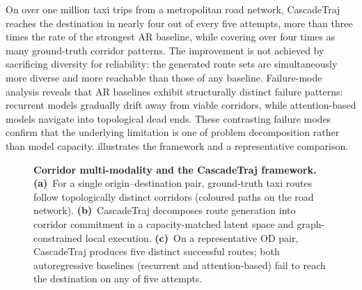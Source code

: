 On over one million taxi trips from a metropolitan road network, CascadeTraj reaches the destination in nearly four out of every five attempts, more than three times the rate of the strongest AR baseline, while covering over four times as many ground-truth corridor patterns.
The improvement is not achieved by sacrificing diversity for reliability: the generated route sets are simultaneously more diverse and more reachable than those of any baseline.
Failure-mode analysis reveals that AR baselines exhibit structurally distinct failure patterns: recurrent models gradually drift away from viable corridors, while attention-based models navigate into topological dead ends.
These contrasting failure modes confirm that the underlying limitation is one of problem decomposition rather than model capacity.
 illustrates the framework and a representative comparison.

\begin{figure}[b]
  \centering
  \caption{%
    \textbf{Corridor multi-modality and the CascadeTraj framework.}
    \textbf{(a)}~For a single origin--destination pair, ground-truth taxi routes follow topologically distinct corridors (coloured paths on the road network).
    \textbf{(b)}~CascadeTraj decomposes route generation into corridor commitment in a capacity-matched latent space and graph-constrained local execution.
    \textbf{(c)}~On a representative OD pair, CascadeTraj produces five distinct successful routes; both autoregressive baselines (recurrent and attention-based) fail to reach the destination on any of five attempts.
  }
  \label{fig:framework}
\end{figure}
